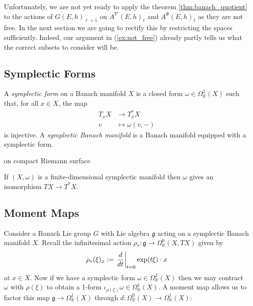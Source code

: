 \documentclass[12pt]{ociamthesis}  %
\begin{document}
Unfortunately, we are not yet ready to apply the theorem \ref{thm:banach_quotient} to
the actions of $G(E,h)_{\ell+1}$ on $A^\nabla(E,h)_\ell$ and
$A^\Phi(E,h)_\ell$ as they are not free. In the next section we are
going to rectify this by restricting the spaces sufficiently.
Indeed, our argument in (\ref{ex:not_free}) already partly tells us what
the correct subsets to consider will be.

\subsection{Symplectic Forms}

\begin{definition}
  A \emph{symplectic form} on a Banach manifold $X$ is a closed form
  $\omega\in\Omega^2_{\mathbb{R}}(X)$ such that, for all $x\in X$, the map
  \begin{align*}
    T_x X & \to T^*_x X         \\
    v     & \mapsto \omega(v,-)
  \end{align*}
  is injective. A \emph{symplectic Banach manifold} is a Banach manifold
  equipped with a symplectic form.
\end{definition}

\begin{example}
  on compact Riemann surface \missingexample
\end{example}

\begin{example}
  If $(X,\omega)$ is a finite-dimensional symplectic manifold then $\omega$
  gives an isomorphism $TX\to T^*X$.
\end{example}

\subsection{Moment Maps}

Consider a Banach Lie group $G$ with Lie algebra $\mathfrak g$ acting on a symplectic
Banach manifold $X$. Recall the infinitesimal action
$\rho_* : \mathfrak g \to \Omega^0_{\mathbb{R}}(X,TX)$ given by
\begin{align*}
  \rho_*(\xi)_x := \left.{\frac{d}{dt}}\right\vert_{t=0} \exp(t\xi)\cdot x
\end{align*}
at $x\in X$. Now if we have a symplectic form $\omega\in\Omega^2_{\mathbb{R}}(X)$ then
we may contract $\omega$ with $\rho(\xi)$ to obtain a 1-form
$\iota_{\rho(\xi)}\omega\in\Omega^1_{\mathbb{R}}(X)$. A moment map
allows us to factor this map $\mathfrak g \to \Omega^1_{\mathbb{R}}(X)$ through
$d : \Omega^0_{\mathbb{R}}(X)\to \Omega^1_{\mathbb{R}}(X)$:
\end{document}
